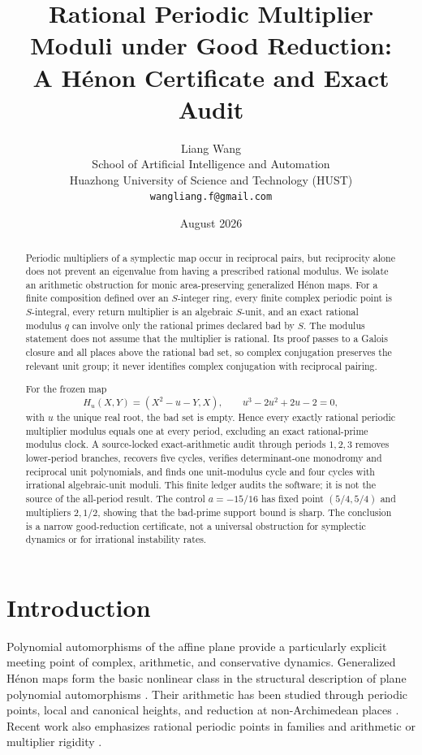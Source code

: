 \documentclass[11pt]{article}
\title{\textbf{Rational Periodic Multiplier Moduli under Good Reduction:\\
A H\'enon Certificate and Exact Audit}}
\author{
 Liang Wang\\
 School of Artificial Intelligence and Automation\\
 Huazhong University of Science and Technology (HUST)\\
 \texttt{wangliang.f@gmail.com}
}
\date{August 2026}
\theoremstyle{definition}
\theoremstyle{remark}
\begin{document}
\maketitle

\begin{abstract}
Periodic multipliers of a symplectic map occur in reciprocal pairs, but
reciprocity alone does not prevent an eigenvalue from having a prescribed
rational modulus.  We isolate an arithmetic obstruction for monic
area-preserving generalized H\'enon maps.  For a finite composition defined
over an $S$-integer ring, every finite complex periodic point is
$S$-integral, every return multiplier is an algebraic $S$-unit, and an exact
rational modulus $q$ can involve only the rational primes declared bad by
$S$.  The modulus statement does not assume that the multiplier is rational.
Its proof passes to a Galois closure and all places above the rational bad
set, so complex conjugation preserves the relevant unit group; it never
identifies complex conjugation with reciprocal pairing.

For the frozen map
\[
 H_u(X,Y)=(X^2-u-Y,X),\qquad u^3-2u^2+2u-2=0,
\]
with $u$ the unique real root, the bad set is empty.  Hence every exactly
rational periodic multiplier modulus equals one at every period, excluding
an exact rational-prime modulus clock.  A source-locked exact-arithmetic
audit through periods $1,2,3$ removes lower-period branches, recovers five
cycles, verifies determinant-one monodromy and reciprocal unit
polynomials, and finds one unit-modulus cycle and four cycles with irrational
algebraic-unit moduli.  This finite ledger audits the software; it is not the
source of the all-period result.  The control $a=-15/16$ has fixed point
$(5/4,5/4)$ and multipliers $2,1/2$, showing that the bad-prime support bound
is sharp.  The conclusion is a narrow good-reduction certificate, not a
universal obstruction for symplectic dynamics or for irrational instability
rates.
\end{abstract}

\section{Introduction}
\label{sec:introduction}

Polynomial automorphisms of the affine plane provide a particularly explicit
meeting point of complex, arithmetic, and conservative dynamics.  Generalized
H\'enon maps form the basic nonlinear class in the structural description of
plane polynomial automorphisms \citep{friedland_milnor_1989}.  Their arithmetic
has been studied through periodic points, local and canonical heights, and
reduction at non-Archimedean places
\citep{silverman_1994,marcello_2003,kawaguchi_2006,kawaguchi_2013,ingram_2014,allen_demark_petsche_2018}.
Recent work also emphasizes rational periodic points in families and arithmetic
or multiplier rigidity
\citep{hsia_kawaguchi_2018,kim_etal_2024,cantat_dujardin_2026_rigidity,cantat_dujardin_2026_multiplier}.
\end{document}
